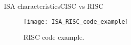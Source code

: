 \begin{frame}{\acs{ISA} characteristics}{CISC vs RISC}
\vspace{-8pt}
\begin{figure}
\centering
\texttt{[image: ISA\_RISC\_code\_example]}
\vspace{-8pt}
\caption{RISC code example.}
\label{Figure:RISC_code}
\end{figure}    
\end{frame}

%
%
